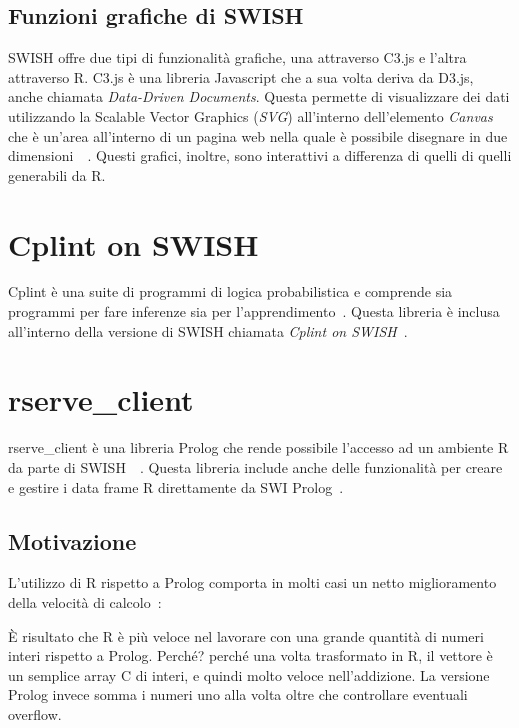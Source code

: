 \documentclass[10pt,titlepage,twoside,a4paper]{report}
\begin{document}
        \subsection{Funzioni grafiche di SWISH}
SWISH offre due tipi di funzionalità grafiche, una attraverso C3.js e l'altra
attraverso R. C3.js è una libreria Javascript che a sua volta deriva da
D3.js, anche chiamata \emph{Data-Driven Documents}. Questa permette di 
visualizzare dei dati utilizzando la Scalable Vector Graphics (\emph{SVG}) 
all'interno dell'elemento \emph{Canvas} che è un'area all'interno di un 
pagina web nella quale è possibile disegnare in due 
dimensioni~\cite{canvasHtml}~\cite{d3js}. Questi grafici, inoltre, sono 
interattivi a differenza di quelli di quelli generabili da R.


\section{Cplint on SWISH}
Cplint è una suite di programmi di logica probabilistica e comprende sia 
programmi per fare inferenze sia per l'apprendimento~\cite{cplint}. Questa 
libreria è inclusa all'interno della versione di SWISH chiamata 
\emph{Cplint 
on SWISH}~\cite{cplintOnSwish}.


    \section{rserve\_client}
rserve\_client è una libreria Prolog che rende possibile 
l'accesso ad un ambiente R da parte di 
SWISH~\cite{rserveClientDefinition}~\cite{rserveclient}. Questa libreria 
include anche delle funzionalità per creare e gestire i data frame R 
direttamente da SWI Prolog~\cite{swishRDataLibrary}.
    
        \subsection{Motivazione}
L'utilizzo di R rispetto a Prolog comporta in molti casi un netto miglioramento 
della velocità di calcolo~\cite{rFaster}:
\begin{displayquote}
[..] È risultato che R è più veloce nel lavorare con una grande quantità
di numeri interi rispetto a Prolog. Perché? perché una volta trasformato in R,
il vettore è un semplice array C di interi, e quindi molto veloce 
nell'addizione. La versione Prolog invece somma i numeri uno alla volta
oltre che controllare eventuali overflow.
\end{displayquote}
\end{document}
